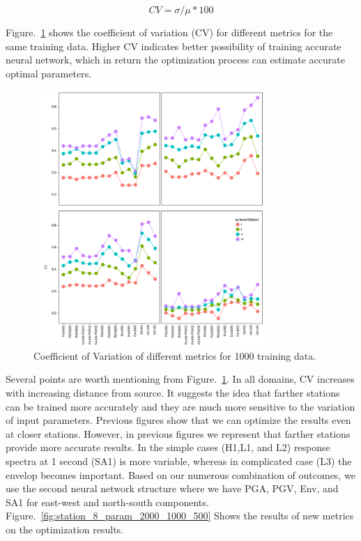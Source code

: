 \begin{equation}
CV=\sigma/\mu * 100 
\end{equation}

Figure.~\ref{fig:metrics_sensitivity} shows the coefficient of variation (CV) for different metrics for the same training data. Higher CV indicates better possibility of training accurate neural network, which in return the optimization process can estimate accurate optimal parameters. 

  \begin{figure}[ht]
    \centering
    \includegraphics[width=0.8\textwidth]{figures/pdf/metrics_sensitivity.pdf}
    \caption{Coefficient of Variation of different metrics for 1000 training data.  }
    \label{fig:metrics_sensitivity}
\end{figure}

Several points are worth mentioning from Figure.~\ref{fig:metrics_sensitivity}. In all domains, CV increases with increasing distance from source. It suggests the idea that farther stations can be trained more accurately and they are much more sensitive to the variation of input parameters. Previous figures show that we can optimize the results even at closer stations. However, in previous figures we represent that farther stations provide more accurate results. In the simple cases (H1,L1, and L2) response spectra at 1 second (SA1) is more variable, whereas in complicated case (L3) the envelop becomes important. Based on our numerous combination of outcomes, we use the second neural network structure where we have PGA, PGV, Env, and SA1 for east-west and north-south components. Figure.~\ref{fig:station_8_param_2000_1000_500} Shows the results of new metrics on the optimization results. 

